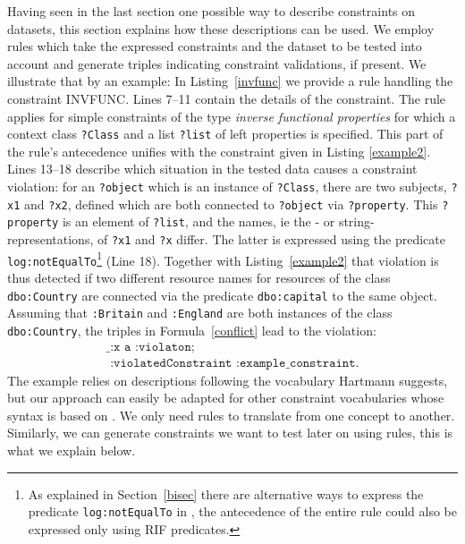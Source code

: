 Having seen in the last section one possible way to describe constraints on \rdf datasets, this section explains how these descriptions can be used. We employ rules
which take the expressed constraints and the \rdf dataset to be tested into account and generate triples indicating constraint validations, if present. 
We illustrate that by an example: In  Listing~\ref{invfunc} we provide a rule handling the constraint INVFUNC. Lines 7--11 contain the details of the constraint. The rule
applies for simple constraints of the type \emph{inverse functional properties} for which a context class \texttt{?Class} and a list \texttt{?list} of left properties 
is specified.
This part of the rule's antecedence unifies with the constraint given in Listing \ref{example2}. Lines 13--18 describe which situation in the tested data causes 
a constraint violation: for an \texttt{?object} which is an instance of \texttt{?Class}, there are two subjects, \texttt{?x1} and \texttt{?x2}, defined 
which are both connected 
to \texttt{?object} via \texttt{?property}. This \texttt{?property} is an element of \texttt{?list},
and the names, ie the \uri- or string-representations, of \texttt{?x1} and \texttt{?x} differ. The latter is expressed using the predicate
\texttt{log:notEqualTo}\footnote{As explained in Section~\ref{bisec} 
there are alternative ways to express the predicate \texttt{log:notEqualTo} in \nthree, the antecedence of the entire rule could also be expressed only using RIF predicates.} 
(Line 18). Together with Listing~\ref{example2} that violation is thus detected if two different resource names 
for resources of the class \texttt{dbo:Country} are connected via the predicate \texttt{dbo:capital} to the same object. Assuming that \texttt{:Britain} and \texttt{:England}
are both instances of the class \texttt{dbo:Country}, the triples in Formula~\ref{conflict} lead to the violation:
\begin{multline}
 \texttt{\_:x a :violaton;}\\\texttt{ :violatedConstraint :example\_constraint.}
\end{multline}
The example relies on descriptions following the vocabulary Hartmann suggests, but our approach can easily be adapted for 
other constraint vocabularies whose syntax is based on \rdf. We only need rules to translate from one concept to another. Similarly, we can generate constraints we want to test later on 
using rules, this is what we explain below.

